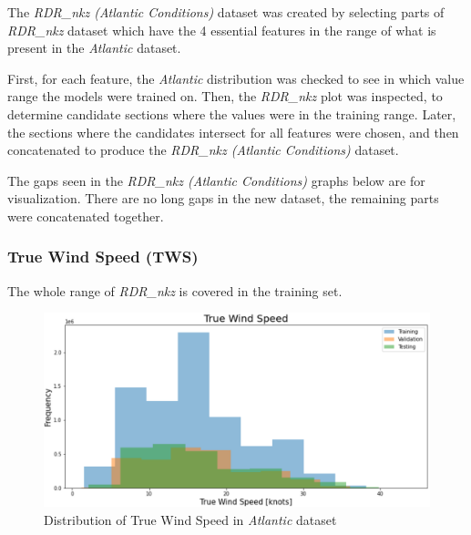 The \textit{RDR\_nkz (Atlantic Conditions)} dataset was created by selecting parts of \textit{RDR\_nkz} dataset which have the 4 essential features in the range of what is present in the \textit{Atlantic} dataset.

First, for each feature, the \textit{Atlantic} distribution was checked to see in which value range the models were trained on. Then, the \textit{RDR\_nkz} plot was inspected, to determine candidate sections where the values were in the training range. Later, the sections where the candidates intersect for all features were chosen, and then concatenated to produce the \textit{RDR\_nkz (Atlantic Conditions)} dataset.

The gaps seen in the \textit{RDR\_nkz (Atlantic Conditions)} graphs below are for visualization. There are no long gaps in the new dataset, the remaining parts were concatenated together.

\clearpage
\subsubsection{True Wind Speed (TWS)}
The whole range of \textit{RDR\_nkz} is covered in the training set.

\begin{figure}[h]
\centering
\includegraphics[width = \hsize]{figures/distributions/atlantic-TWS.png}
\caption{Distribution of True Wind Speed in \textit{Atlantic} dataset \cite{charles}}
\end{figure}

